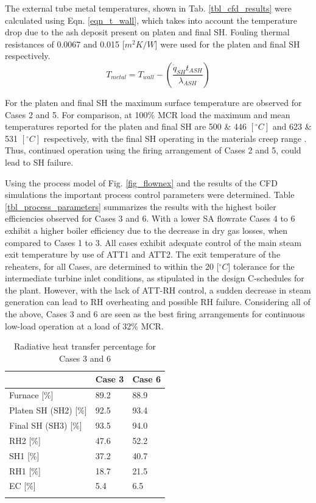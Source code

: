 \documentclass[11pt,cleanfoot]{asme2ej}
\begin{document}
The external tube metal temperatures, shown in Tab. \ref{tbl_cfd_results} were calculated using Eqn. \ref{eqn_t_wall}, which takes into account the temperature drop due to the ash deposit present on platen and final SH. Fouling thermal resistances of 0.0067 and 0.015 [$m^2K/W$] were used for the platen and final SH respectively.
\begin{equation}\label{eqn_t_wall}
T_{metal} = T_{wall} - \left(\frac{\dot{q}_{SH}t_{ASH}}{\lambda_{ASH}}\right)
\end{equation}

For the platen and final SH the maximum surface temperature are observed for Cases 2 and 5. For comparison, at 100\% MCR load the maximum and mean temperatures reported for the platen and final SH are 500 \& 446 $[^\circ C]$ and 623 \& 531 $[^\circ C]$ respectively, with the final SH operating in the materials creep range \cite{Laubscher2019b}. Thus, continued operation using the firing arrangement of Cases 2 and 5, could lead to SH failure.

Using the process model of Fig. \ref{fig_flownex} and the results of the CFD simulations the important process control parameters were determined. Table \ref{tbl_process_parameters} summarizes the results with the highest boiler efficiencies observed for Cases 3 and 6. With a lower SA flowrate Cases 4 to 6 exhibit a higher boiler efficiency due to the decrease in dry gas losses, when compared to Cases 1 to 3. All cases exhibit adequate control of the main steam exit temperature by use of ATT1 and ATT2. The exit temperature of the reheaters, for all Cases, are determined to within the 20 [$^\circ C$] tolerance for the intermediate turbine inlet conditions, as stipulated in the design C-schedules for the plant. However, with the lack of ATT-RH control, a sudden decrease in steam generation can lead to RH overheating and possible RH failure. Considering all of the above, Cases 3 and 6 are seen as the best firing arrangements for continuous low-load operation at a load of 32\% MCR.
\begin{table}[h!]
\centering
\caption{Radiative heat transfer percentage for Cases 3 and 6}
\vspace{2mm}
{\tabulinesep=1.2mm
\begin{tabularx}{0.6\textwidth}{p{} XX}
\hline
 &\textbf{Case 3}&\textbf{Case 6}\\
\hline
Furnace [\%] & 89.2 & 88.9\\
Platen SH (SH2) [\%] & 92.5& 93.4\\
Final SH (SH3) [\%] & 93.5& 94.0\\
RH2 [\%] & 47.6& 52.2\\
SH1 [\%] & 37.2& 40.7\\
RH1 [\%] & 18.7& 21.5\\
EC [\%] & 5.4& 6.5\\
\hline
\label{tbl_rad_conv}
\end{tabularx}}
\end{table}
\end{document}
